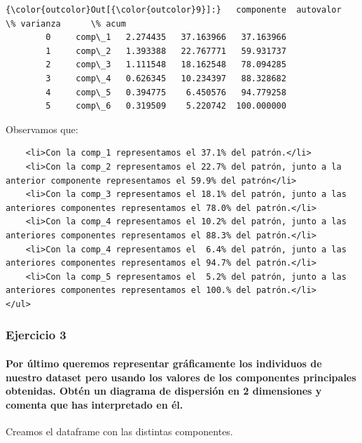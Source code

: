 \documentclass[11pt]{article}
\begin{document}
\begin{Verbatim}[commandchars=\\\{\}]
{\color{outcolor}Out[{\color{outcolor}9}]:}   componente  autovalor  \% varianza      \% acum
        0     comp\_1   2.274435   37.163966   37.163966
        1     comp\_2   1.393388   22.767771   59.931737
        2     comp\_3   1.111548   18.162548   78.094285
        3     comp\_4   0.626345   10.234397   88.328682
        4     comp\_5   0.394775    6.450576   94.779258
        5     comp\_6   0.319509    5.220742  100.000000
\end{Verbatim}
            
    Observamos que:

\begin{verbatim}
    <li>Con la comp_1 representamos el 37.1% del patrón.</li>
    <li>Con la comp_2 representamos el 22.7% del patrón, junto a la anterior componente representamos el 59.9% del patrón</li>
    <li>Con la comp_3 representamos el 18.1% del patrón, junto a las anteriores componentes representamos el 78.0% del patrón.</li>
    <li>Con la comp_4 representamos el 10.2% del patrón, junto a las anteriores componentes representamos el 88.3% del patrón.</li>
    <li>Con la comp_4 representamos el  6.4% del patrón, junto a las anteriores componentes representamos el 94.7% del patrón.</li>
    <li>Con la comp_5 representamos el  5.2% del patrón, junto a las anteriores componentes representamos el 100.% del patrón.</li>
</ul>
\end{verbatim}

    \subsubsection{Ejercicio 3}\label{ejercicio-3}

    \paragraph{Por último queremos representar gráficamente los individuos
de nuestro dataset pero usando los valores de los componentes
principales obtenidas. Obtén un diagrama de dispersión en 2 dimensiones
y comenta que has interpretado en
él.}\label{por-uxfaltimo-queremos-representar-gruxe1ficamente-los-individuos-de-nuestro-dataset-pero-usando-los-valores-de-los-componentes-principales-obtenidas.-obtuxe9n-un-diagrama-de-dispersiuxf3n-en-2-dimensiones-y-comenta-que-has-interpretado-en-uxe9l.}

    Creamos el dataframe con las distintas componentes.
\end{document}
